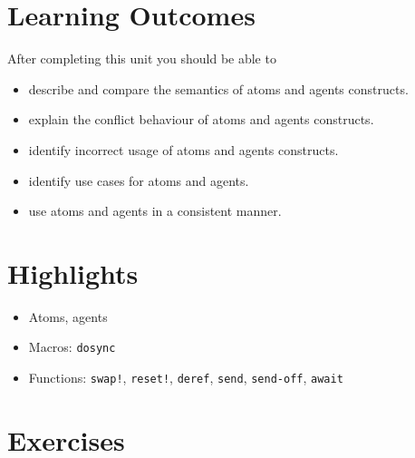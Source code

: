\documentclass[11pt,a4paper]{article}
\begin{document}
\section{Learning Outcomes}

After completing this unit you should be able to

\begin{itemize}
	\item describe and compare the semantics of atoms and agents constructs.
    \item explain the conflict behaviour of atoms and agents constructs.
    \item identify incorrect usage of atoms and agents constructs.
    \item identify use cases for atoms and agents.
    \item use atoms and agents in a consistent manner.
\end{itemize}

\section{Highlights}

\begin{itemize}
    \item Atoms, agents
    \item Macros: \verb|dosync|
    \item Functions: \verb|swap!|, \verb|reset!|, \verb|deref|, \verb|send|, \verb|send-off|, \verb|await|
\end{itemize}



\section{Exercises}
\end{document}
